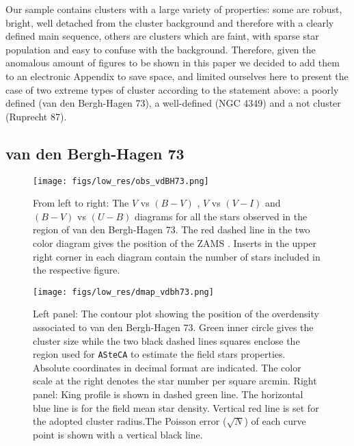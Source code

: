 \documentclass{aa}
\begin{document}
Our sample contains clusters with a large variety of properties: some are
robust, bright, well detached from the cluster background and therefore with a
clearly defined main sequence, others are clusters which are faint, with sparse
star population and easy to confuse with the background. Therefore, given the
anomalous amount of figures to be shown in this paper we decided to add them to
an electronic Appendix to save space, and limited ourselves here to present the
case of two extreme types of cluster according to the statement above: a poorly
defined (van den Bergh-Hagen 73), a well-defined (NGC 4349) and a not cluster 
(Ruprecht 87).


\subsection{van den Bergh-Hagen 73}

\begin{figure*}[ht]
    \centering
    \texttt{[image: figs/low\_res/obs\_vdBH73.png]}
    \caption{From left to right: The $V$ vs $(B-V)$ , $V$ vs $(V-I)$ and
    $(B-V)$ vs $(U-B)$ diagrams for all the stars observed in the region of van
    den Bergh-Hagen 73.
    The red dashed line in the two color diagram gives the position of the ZAMS
    \citep{Aller1982}. Inserts in the upper right corner in each
    diagram contain the number of stars included in the respective figure.}
    \label{fig3}
\end{figure*}

\begin{figure*}[ht]
    \centering
    \texttt{[image: figs/low\_res/dmap\_vdbh73.png]}
    \caption{Left panel: The contour plot showing the position of the
    overdensity associated to van den Bergh-Hagen 73. Green inner circle gives
    the cluster size while the two black dashed lines squares enclose the region
    used for \texttt{ASteCA} to estimate the field stars properties. Absolute
    coordinates in decimal format are indicated. The color scale at the right
    denotes the star number per square arcmin. Right panel: King profile is
    shown in dashed green line. The horizontal blue line is for the field
    mean star density. Vertical red line is set for the adopted cluster
    radius.The Poisson error ($\sqrt{N}$) of each curve point is shown with a
    vertical black line.}
    \label{fig4}
\end{figure*}
\end{document}
